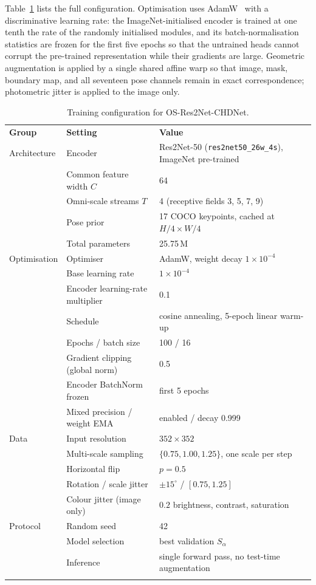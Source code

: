 \documentclass[3p,times,procedia]{elsarticle}
\begin{document}
Table~\ref{tab:hparams} lists the full configuration. Optimisation uses AdamW~\cite{adamw} with a discriminative learning rate: the ImageNet-initialised encoder is trained at one tenth the rate of the randomly initialised modules, and its batch-normalisation statistics are frozen for the first five epochs so that the untrained heads cannot corrupt the pre-trained representation while their gradients are large. Geometric augmentation is applied by a single shared affine warp so that image, mask, boundary map, and all seventeen pose channels remain in exact correspondence; photometric jitter is applied to the image only.

\begin{table}[h]
\caption{Training configuration for OS-Res2Net-CHDNet.}
\label{tab:hparams}
\begin{tabular*}{\hsize}{@{\extracolsep{\fill}}lll@{}}
\toprule
\textbf{Group} & \textbf{Setting} & \textbf{Value} \\
\colrule
Architecture & Encoder & Res2Net-50 (\texttt{res2net50\_26w\_4s}), ImageNet pre-trained \\
             & Common feature width $C$ & 64 \\
             & Omni-scale streams $T$ & 4 (receptive fields 3, 5, 7, 9) \\
             & Pose prior & 17 COCO keypoints, cached at $H/4 \times W/4$ \\
             & Total parameters & 25.75\,M \\
\colrule
Optimisation & Optimiser & AdamW, weight decay $1\times10^{-4}$ \\
             & Base learning rate & $1\times10^{-4}$ \\
             & Encoder learning-rate multiplier & 0.1 \\
             & Schedule & cosine annealing, 5-epoch linear warm-up \\
             & Epochs / batch size & 100 / 16 \\
             & Gradient clipping (global norm) & 0.5 \\
             & Encoder BatchNorm frozen & first 5 epochs \\
             & Mixed precision / weight EMA & enabled / decay 0.999 \\
\colrule
Data         & Input resolution & $352 \times 352$ \\
             & Multi-scale sampling & $\{0.75, 1.00, 1.25\}$, one scale per step \\
             & Horizontal flip & $p = 0.5$ \\
             & Rotation / scale jitter & $\pm 15^{\circ}$ / $[0.75, 1.25]$ \\
             & Colour jitter (image only) & $0.2$ brightness, contrast, saturation \\
\colrule
Protocol     & Random seed & 42 \\
             & Model selection & best validation $S_\alpha$ \\
             & Inference & single forward pass, no test-time augmentation \\
\botrule
\end{tabular*}
\end{table}
\end{document}
